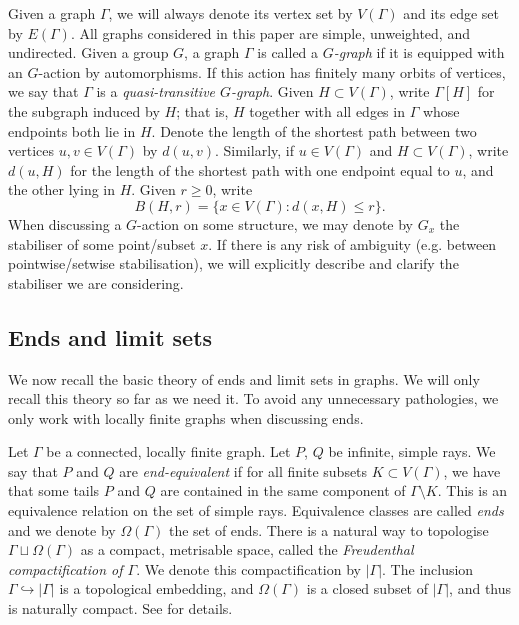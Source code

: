 \documentclass[11pt,a4paper]{amsart}
\newcommand{\into}{\hookrightarrow}
\theoremstyle{definition}
\begin{document}
Given a graph $\Gamma$, we will always denote its vertex set by $V(\Gamma)$ and its edge set by $E(\Gamma)$. All graphs considered in this paper are simple, unweighted, and undirected. Given a group $G$, a graph $\Gamma$ is called a \emph{$G$-graph} if it is equipped with an $G$-action by automorphisms. If this action has finitely many orbits of vertices, we say that $\Gamma$ is a \emph{quasi-transitive $G$-graph}.  Given $H \subset V(\Gamma)$, write $\Gamma[H]$ for the subgraph induced by $H$; that is, $H$ together with all edges in $\Gamma$ whose endpoints both lie in $H$. 
Denote the length of the shortest path between two vertices $u,v \in V(\Gamma)$ by $d(u,v)$. Similarly, if $u \in V(\Gamma)$ and $H \subset V(\Gamma)$, write $d(u,H)$ for the length of the shortest path with one endpoint equal to $u$, and the other lying in $H$.
Given $r \geq 0$, write 
$$
B(H,r) = \{x \in V(\Gamma) : d(x, H) \leq r \}. 
$$
When discussing a $G$-action on some structure, we may denote by $G_x$ the stabiliser of some point/subset $x$. If there is any risk of ambiguity (e.g. between pointwise/setwise stabilisation), we will explicitly describe and clarify the stabiliser we are considering. 



\subsection{Ends and limit sets} We now recall the basic theory of ends and limit sets in graphs. We will only recall this theory so far as we need it. To avoid any unnecessary pathologies, we only work with locally finite graphs when discussing ends. 

Let $\Gamma$ be a connected, locally finite graph. Let $P$, $Q$ be infinite, simple rays. We say that $P$ and $Q$ are \emph{end-equivalent} if for all finite subsets $K \subset V(\Gamma)$, we have that some tails $P$ and $Q$ are contained in the same component of $\Gamma \setminus K$. This is an equivalence relation on the set of simple rays. Equivalence classes are called \emph{ends} and we denote by $\Omega(\Gamma)$ the set of ends. There is a natural way to topologise $\Gamma \sqcup \Omega(\Gamma)$ as a compact, metrisable space, called the \emph{Freudenthal compactification of $\Gamma$}. We denote this compactification by $|\Gamma|$. The inclusion $\Gamma \into |\Gamma|$ is a topological embedding, and $\Omega(\Gamma)$ is a closed subset of $|\Gamma|$, and thus is naturally compact.  See \cite[\S21]{woess2000random} for details.
\end{document}
